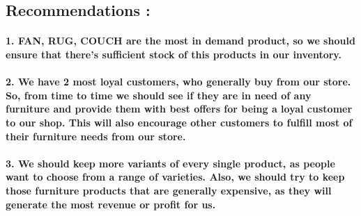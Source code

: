 \documentclass[
]{article}
\begin{document}
\hypertarget{recommendations}{%
\subsection{Recommendations :}\label{recommendations}}

\hypertarget{fan-rug-couch-are-the-most-in-demand-product-so-we-should-ensure-that-theres-sufficient-stock-of-this-products-in-our-inventory.}{%
\paragraph{1. FAN, RUG, COUCH are the most in demand product, so we
should ensure that there's sufficient stock of this products in our
inventory.}\label{fan-rug-couch-are-the-most-in-demand-product-so-we-should-ensure-that-theres-sufficient-stock-of-this-products-in-our-inventory.}}

\hypertarget{we-have-2-most-loyal-customers-who-generally-buy-from-our-store.-so-from-time-to-time-we-should-see-if-they-are-in-need-of-any-furniture-and-provide-them-with-best-offers-for-being-a-loyal-customer-to-our-shop.-this-will-also-encourage-other-customers-to-fulfill-most-of-their-furniture-needs-from-our-store.}{%
\paragraph{2. We have 2 most loyal customers, who generally buy from our
store. So, from time to time we should see if they are in need of any
furniture and provide them with best offers for being a loyal customer
to our shop. This will also encourage other customers to fulfill most of
their furniture needs from our
store.}\label{we-have-2-most-loyal-customers-who-generally-buy-from-our-store.-so-from-time-to-time-we-should-see-if-they-are-in-need-of-any-furniture-and-provide-them-with-best-offers-for-being-a-loyal-customer-to-our-shop.-this-will-also-encourage-other-customers-to-fulfill-most-of-their-furniture-needs-from-our-store.}}

\hypertarget{we-should-keep-more-variants-of-every-single-product-as-people-want-to-choose-from-a-range-of-varieties.-also-we-should-try-to-keep-those-furniture-products-that-are-generally-expensive-as-they-will-generate-the-most-revenue-or-profit-for-us.}{%
\paragraph{3. We should keep more variants of every single product, as
people want to choose from a range of varieties. Also, we should try to
keep those furniture products that are generally expensive, as they will
generate the most revenue or profit for
us.}\label{we-should-keep-more-variants-of-every-single-product-as-people-want-to-choose-from-a-range-of-varieties.-also-we-should-try-to-keep-those-furniture-products-that-are-generally-expensive-as-they-will-generate-the-most-revenue-or-profit-for-us.}}
\end{document}
